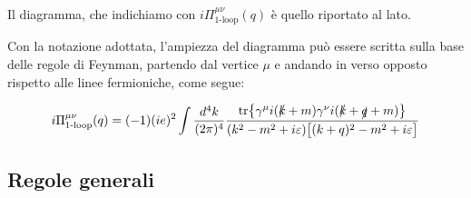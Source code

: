 \documentclass[../main.tex]{subfiles}
\begin{document}
Il diagramma, che indichiamo con $\boxed{i\Pi^{\mu\nu}_{\text{1-loop}}(q)}$ è quello riportato al lato.

Con la notazione adottata, l'ampiezza del diagramma può essere scritta sulla base delle regole di Feynman, partendo dal vertice $\mu$ e andando in verso opposto rispetto alle linee fermioniche, come segue:

\begin{equation}
    i\Pi^{\mu\nu}_{\text{1-loop}}(q) = (-1)(ie)^2\int \frac{d^4k}{(2\pi)^4} \frac{\tr{\gamma^\mu i (\slashed k + m)\gamma^\nu i(\slashed k + \slashed q + m)}}{(k^2-m^2+i\varepsilon)\bigl[(k+q)^2-m^2+i\varepsilon\bigr]}
    \label{eq:PSE_1loop_feynman}
\end{equation}


\subsection{Regole generali}
\end{document}
